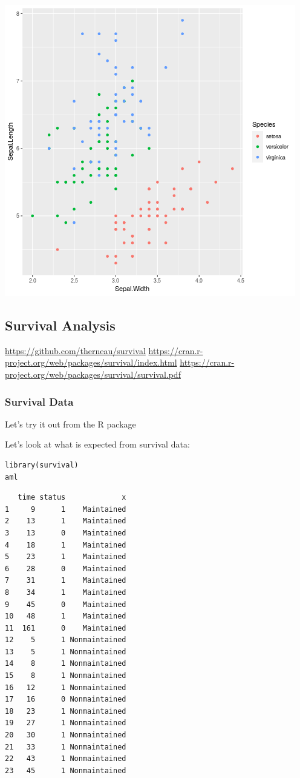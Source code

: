 \documentclass[11pt]{article}
\begin{document}
\begin{center}
\includegraphics[width=.9\linewidth]{test.png}
\end{center}



\subsection{Survival Analysis}
\label{sec:org5aafdf0}
\url{https://github.com/therneau/survival}
\url{https://cran.r-project.org/web/packages/survival/index.html}
\url{https://cran.r-project.org/web/packages/survival/survival.pdf}
\subsubsection{Survival Data}
\label{sec:org8c77eb4}

Let's try it out from the R package

Let's look at what is expected from survival data:

\begin{verbatim}
library(survival)
aml
\end{verbatim}

\begin{verbatim}
   time status             x
1     9      1    Maintained
2    13      1    Maintained
3    13      0    Maintained
4    18      1    Maintained
5    23      1    Maintained
6    28      0    Maintained
7    31      1    Maintained
8    34      1    Maintained
9    45      0    Maintained
10   48      1    Maintained
11  161      0    Maintained
12    5      1 Nonmaintained
13    5      1 Nonmaintained
14    8      1 Nonmaintained
15    8      1 Nonmaintained
16   12      1 Nonmaintained
17   16      0 Nonmaintained
18   23      1 Nonmaintained
19   27      1 Nonmaintained
20   30      1 Nonmaintained
21   33      1 Nonmaintained
22   43      1 Nonmaintained
23   45      1 Nonmaintained
\end{verbatim}
\end{document}
